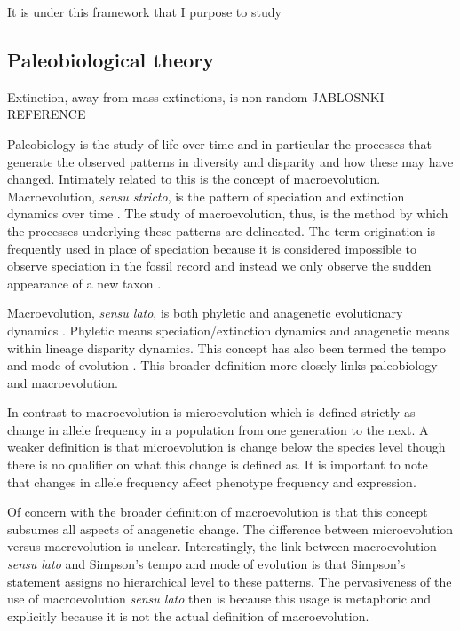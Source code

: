 \documentclass[12pt,letterpaper]{article}
\begin{document}
It is under this framework that I purpose to study
%

\subsection{Paleobiological theory}

Extinction, away from mass extinctions, is non-random JABLOSNKI REFERENCE

Paleobiology is the study of life over time and in particular the processes that generate the observed patterns in diversity and disparity and how these may have changed.  %
Intimately related to this is the concept of macroevolution. Macroevolution, \textit{sensu stricto}, is the pattern of speciation and extinction dynamics over time \citep{Jablonski2008a}. The study of macroevolution, thus, is the method by which the processes underlying these patterns are delineated. The term origination is frequently used in place of speciation because it is considered impossible to observe speciation in the fossil record and instead we only observe the sudden appearance of a new taxon \citep{Coyne2004}.

Macroevolution, \textit{sensu lato}, is both phyletic and anagenetic evolutionary dynamics \citep{Foote2007b}. Phyletic means speciation/extinction dynamics and anagenetic means within lineage disparity dynamics. This concept has also been termed the tempo and mode of evolution \citep{Simpson1944}. This broader definition more closely links paleobiology and macroevolution.

In contrast to macroevolution is microevolution \citep{Simpson1944,Foote2007b} which is defined strictly as change in allele frequency in a population from one generation to the next. A weaker definition is that microevolution is change below the species level \citep{Foote2007b} though there is no qualifier on what this change is defined as. It is important to note that changes in allele frequency affect phenotype frequency and expression.


Of concern with the broader definition of macroevolution is that this concept subsumes all aspects of anagenetic change. The difference between microevolution versus macrevolution is unclear. Interestingly, the link between macroevolution \textit{sensu lato} and Simpson's tempo and mode of evolution is that Simpson's statement assigns no hierarchical level to these patterns. The pervasiveness of the use of macroevolution \textit{sensu lato} then is because this usage is metaphoric and explicitly because it is not the actual definition of macroevolution.
\end{document}
